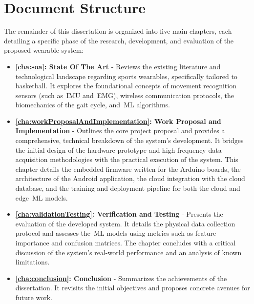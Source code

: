 \section{Document Structure}
\label{sec:document_structure}

The remainder of this dissertation is organized into five main chapters, each detailing a specific phase of the research, development, and evaluation of the proposed wearable system:

\begin{itemize}
    \item \textbf{\autoref{cha:soa}: State Of The Art} - Reviews the existing literature and technological landscape regarding sports wearables, specifically tailored to basketball. It explores the foundational concepts of 
    movement recognition sensors (such as~\gls{IMU} and~\gls{EMG}), wireless communication protocols, the biomechanics of the gait cycle, and~\gls{ML} algorithms.
    \item \textbf{\autoref{cha:workProposalAndImplementation}: Work Proposal and Implementation} - Outlines the core project proposal
and provides a comprehensive, technical breakdown of the system's development. It bridges the initial design of the hardware prototype and high-frequency data acquisition methodologies with the practical execution of the system. This chapter details
the embedded firmware written for the Arduino boards, the architecture
of the Android application, the cloud integration with the cloud database, and the
training and deployment pipeline for both the cloud and edge~\gls{ML} models.
    \item \textbf{\autoref{cha:validationTesting}: Verification and Testing} - Presents the evaluation of the developed system.
It details the physical data collection protocol and assesses the~\gls{ML} models using
metrics such as feature importance and confusion matrices. The chapter concludes
with a critical discussion of the system's real-world performance and an analysis of
known limitations.
    \item \textbf{\autoref{cha:conclusion}: Conclusion} - Summarizes the achievements of the dissertation. It revisits the initial objectives and proposes concrete avenues for future work.
\end{itemize}


